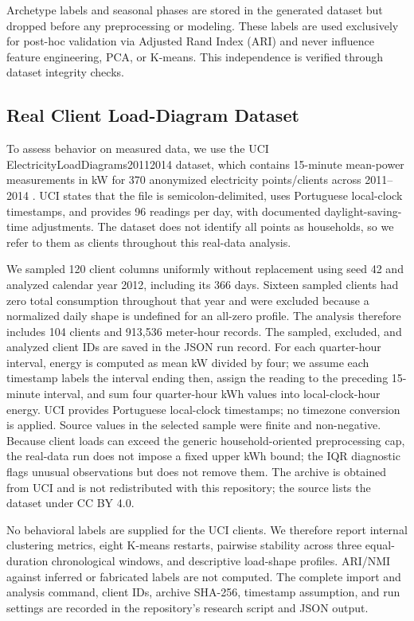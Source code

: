 \documentclass[11pt,a4paper]{article}
\begin{document}
Archetype labels and seasonal phases are stored in the generated dataset but dropped before any preprocessing or modeling. These labels are used exclusively for post-hoc validation via Adjusted Rand Index (ARI) and never influence feature engineering, PCA, or K-means. This independence is verified through dataset integrity checks.

\subsection{Real Client Load-Diagram Dataset}
\label{sec:real_dataset}

To assess behavior on measured data, we use the UCI ElectricityLoadDiagrams20112014 dataset, which contains 15-minute mean-power measurements in kW for 370 anonymized electricity points/clients across 2011--2014 \cite{trindade2015electricityloaddiagrams}. UCI states that the file is semicolon-delimited, uses Portuguese local-clock timestamps, and provides 96 readings per day, with documented daylight-saving-time adjustments. The dataset does not identify all points as households, so we refer to them as clients throughout this real-data analysis.

We sampled 120 client columns uniformly without replacement using seed 42 and analyzed calendar year 2012, including its 366 days. Sixteen sampled clients had zero total consumption throughout that year and were excluded because a normalized daily shape is undefined for an all-zero profile. The analysis therefore includes 104 clients and 913,536 meter-hour records. The sampled, excluded, and analyzed client IDs are saved in the JSON run record. For each quarter-hour interval, energy is computed as mean kW divided by four; we assume each timestamp labels the interval ending then, assign the reading to the preceding 15-minute interval, and sum four quarter-hour kWh values into local-clock-hour energy. UCI provides Portuguese local-clock timestamps; no timezone conversion is applied. Source values in the selected sample were finite and non-negative. Because client loads can exceed the generic household-oriented preprocessing cap, the real-data run does not impose a fixed upper kWh bound; the IQR diagnostic flags unusual observations but does not remove them. The archive is obtained from UCI and is not redistributed with this repository; the source lists the dataset under CC BY 4.0.

No behavioral labels are supplied for the UCI clients. We therefore report internal clustering metrics, eight K-means restarts, pairwise stability across three equal-duration chronological windows, and descriptive load-shape profiles. ARI/NMI against inferred or fabricated labels are not computed. The complete import and analysis command, client IDs, archive SHA-256, timestamp assumption, and run settings are recorded in the repository's research script and JSON output.
\end{document}
